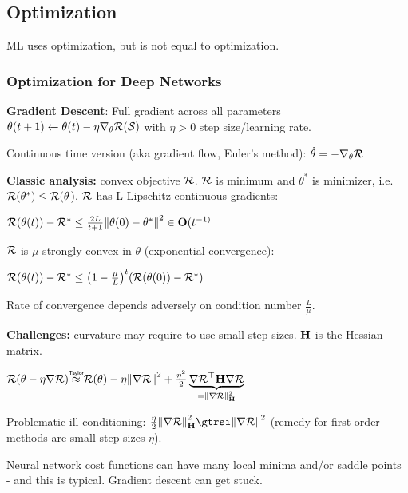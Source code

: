 \subsection{Optimization}
\label{sub:optimization}
    ML uses optimization, but is not equal to optimization.
    
    \subsubsection{Optimization for Deep Networks}
    
    \textbf{Gradient Descent}: Full gradient across all parameters\\
    \tab$\theta(t+1)\xleftarrow{}\theta(t)-\eta\nabla_\theta\mathcal{R}(\mathcal{S})$ with $\eta > 0$ step size/learning rate.
    
    Continuous time version (aka gradient flow, Euler's method): $\Dot{\theta}=-\nabla_\theta\mathcal{R}$
    
    \textbf{Classic analysis:} convex objective $\mathcal{R}$. $\mathcal{R}$ is minimum and $\theta^*$ is minimizer, i.e. $\mathcal{R}(\theta^*) \leq \mathcal{R}(\theta$). $\mathcal{R}$ has L-Lipschitz-continuous gradients:
    
    \tab $\mathcal{R}(\theta(t))-\mathcal{R}^* \leq \frac{2L}{t+1} \norm{\theta(0)-\theta^*}^2 \in \mathbf O(t^{-1)}$
    
    $\mathcal{R}$ is $\mu$-strongly convex in $\theta$ (exponential convergence):
    
    \tab $\mathcal{R}(\theta(t)) - \mathcal{R}^* \leq \big( 1 - \frac{\mu}{L}\big)^t (\mathcal{R}(\theta(0))-\mathcal{R}^*)$
    
    Rate of convergence depends adversely on condition number $\frac{L}{\mu}$.
    
    \textbf{Challenges:} curvature may require to use small step sizes.  $\mathbf H$ is the Hessian matrix.
    
    \tab $\cR(\theta-\eta\nabla\cR) \mathrel{\overset{\makebox[0pt]{\mbox{\normalfont\tiny\sffamily Taylor}}}{\approx}} \cR(\theta)-\eta\norm{\nabla\cR}^2+\frac{\eta^2}{2}\underbrace{\nabla\cR^\top\vH\nabla\cR}_{=\norm{\nabla\cR}^2_\vH}$
    
    Problematic ill-conditioning: $\frac{\eta}{2}\norm{\nabla\cR}^2_\vH \gtrsi \norm{\nabla\cR}^2$ (remedy for first order methods are small step sizes $\eta$).
    
    Neural network cost functions can have many local minima and/or saddle points - and this is typical. Gradient descent can get stuck.

    
    
